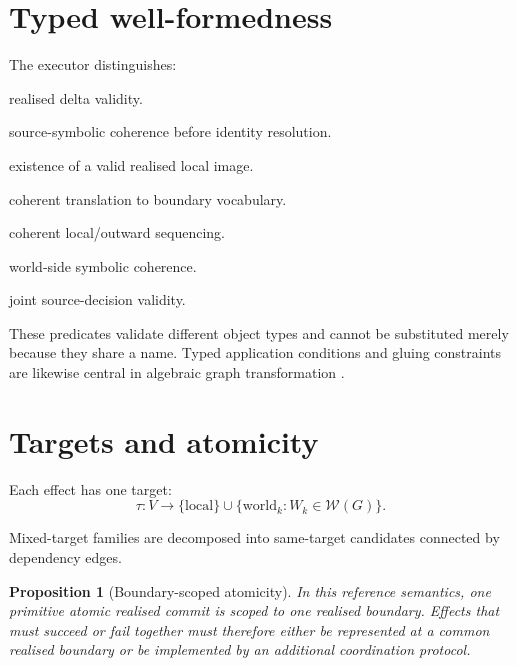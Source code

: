 \documentclass[11pt,a4paper]{article}
\newtheorem{proposition}[theorem]{Proposition}
\theoremstyle{remark}
\begin{document}
\section{Typed well-formedness}\label{sec:wf}

The executor distinguishes:

\begin{description}[leftmargin=*,style=nextline]
\item[$\operatorname{WF}(g,\Delta)$] realised delta validity.
\item[$\operatorname{WF}_{\mathrm{sym}}(g,S)$] source-symbolic coherence before identity resolution.
\item[$\operatorname{WF}_{\mathrm{app}}(g,S)$] existence of a valid realised local image.
\item[$\operatorname{WF}_{\mathrm{rel}}(S)$] coherent translation to boundary vocabulary.
\item[$\operatorname{WF}_{\mathrm{seq}}(S^L,S^A)$] coherent local/outward sequencing.
\item[$\operatorname{WF}^W_{\mathrm{sym}}(W,S)$] world-side symbolic coherence.
\item[$\operatorname{WF}_{\mathrm{decision}}(g,S)$] joint source-decision validity.
\end{description}

These predicates validate different object types and cannot be substituted merely because they share a name. Typed application conditions and gluing constraints are likewise central in algebraic graph transformation \citep{corradini1997,ehrig2006}.

\section{Targets and atomicity}\label{sec:atomicity}

Each effect has one target:
\[
\tau:V\rightarrow
\{\mathrm{local}\}
\cup
\{\mathrm{world}_k:W_k\in\mathcal W(G)\}.
\]

Mixed-target families are decomposed into same-target candidates connected by dependency edges.

\begin{proposition}[Boundary-scoped atomicity]\label{prop:boundary-atomicity}
In this reference semantics, one primitive atomic realised commit is scoped to one realised boundary. Effects that must succeed or fail together must therefore either be represented at a common realised boundary or be implemented by an additional coordination protocol.
\end{proposition}
\end{document}
